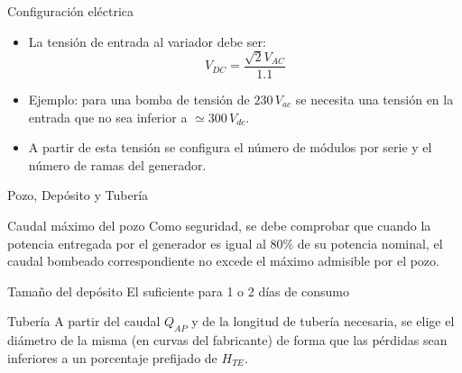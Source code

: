 \documentclass[xcolor={usenames,svgnames,dvipsnames}]{beamer}
\begin{document}
\begin{frame}[label={sec:org2b20627}]{Configuración eléctrica}
\begin{itemize}
\item La \alert{tensión de entrada al variador} debe ser:$$V_{DC}=\frac{\sqrt{2}V_{AC}}{1.1}$$

\item Ejemplo: para una bomba de tensión de \(230\, V_{ac}\) se necesita una tensión en la entrada que no sea inferior a \(\simeq300\, V_{dc}\).

\item A partir de esta tensión se configura el \alert{número de módulos por serie} y el \alert{número de ramas} del generador.
\end{itemize}
\end{frame}

\begin{frame}[label={sec:org43c3673}]{Pozo, Depósito y Tubería}
\begin{block}{Caudal máximo del pozo}
Como seguridad, se debe comprobar que cuando la potencia entregada por el generador es igual al 80\% de su potencia nominal, el caudal bombeado correspondiente no excede el máximo admisible por el pozo.
\end{block}

\begin{block}{Tamaño del depósito}
El suficiente para \alert{1 o 2 días de consumo}
\end{block}

\begin{block}{Tubería}
A partir del caudal \(Q_{AP}\) y de la longitud de tubería necesaria, se elige el \alert{diámetro} de la misma (en curvas del fabricante) de forma que las pérdidas sean inferiores a un porcentaje prefijado de \(H_{TE}\).
\end{block}
\end{frame}
\end{document}
